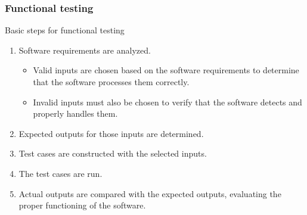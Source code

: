 \begin{frame}[hasprev=true, hasnext=false]
\frametitle{Functional testing}

\begin{block:procedure}{Basic steps for functional testing}
\begin{enumerate}
	\item Software requirements are analyzed.
	\begin{itemize}
		\item Valid inputs are chosen based on the software requirements
		to determine that the software processes them correctly.

		\item Invalid inputs must also be chosen to verify that the software
		detects and properly handles them.
	\end{itemize}

	\item Expected outputs for those inputs are determined.

	\item Test cases are constructed with the selected inputs.

	\item The test cases are run.

	\item Actual outputs are compared with the expected outputs, evaluating
	the proper functioning of the software.
\end{enumerate}
\end{block:procedure}
\end{frame}
